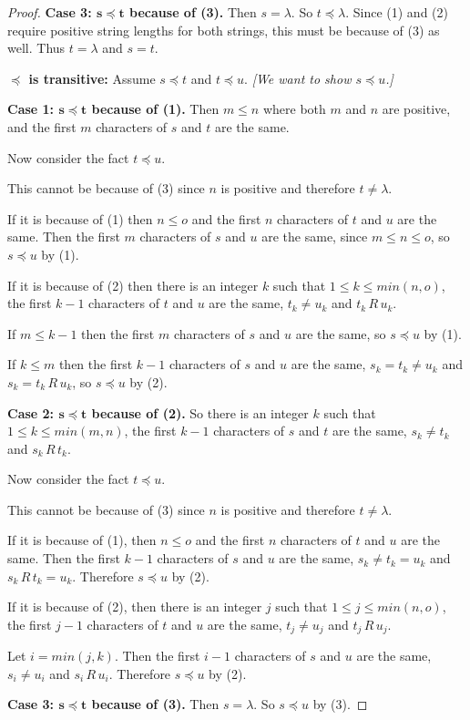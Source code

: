 \documentclass[14pt]{extarticle}
\begin{document}
\begin{proof}
                {\bf Case 3: \(\bm{s \preceq t}\) because of (3).} Then \(s = \lambda\). So \(t \preceq \lambda\). Since (1) and (2)
        require positive string lengths for both strings, this must be because of (3) as well. Thus \(t=\lambda\) and \(s=t\).

                {\bf \(\bm{\preceq}\) is transitive:} Assume \(s\preceq t\) and \(t\preceq u\). {\it[We want to show \(s\preceq u\).]}

                {\bf Case 1: \(\bm{s \preceq t}\) because of (1).} Then \(m \leq n\) where both $m$ and $n$ are positive, and the first
        $m$ characters of $s$ and $t$ are the same.

        Now consider the fact \(t \preceq u\).

        This cannot be because of (3) since $n$ is positive and therefore \(t \neq \lambda\).

        If it is because of (1) then \(n \leq o\) and the first $n$ characters of $t$ and $u$ are the same. Then the first $m$
        characters of $s$ and $u$ are the same, since \(m \leq n \leq o\), so \(s \preceq u\) by (1).

        If it is because of (2) then there is an integer $k$ such that \(1 \leq k \leq min(n,o)\), the first $k-1$ characters
        of $t$ and $u$ are the same, \(t_k \neq u_k\) and \(t_k \,R\, u_k\).

        If \(m \leq k-1\) then the first $m$ characters of $s$ and $u$ are the same, so \(s \preceq u\) by (1).

        If \(k \leq m\) then the first $k-1$ characters of $s$ and $u$ are the same, \(s_k = t_k \neq u_k\) and \(s_k = t_k \,R\, u_k\), so \(s \preceq u\) by (2).

                {\bf Case 2: \(\bm{s \preceq t}\) because of (2).} So there is an integer $k$ such that \(1 \leq k \leq min(m,n)\), the
        first $k-1$ characters of $s$ and $t$ are the same, \(s_k \neq t_k\) and \(s_k \,R\, t_k\).

        Now consider the fact \(t \preceq u\).

        This cannot be because of (3) since $n$ is positive and therefore \(t \neq \lambda\).

        If it is because of (1), then \(n \leq o\) and the first $n$ characters of $t$ and $u$ are the same. Then the first
        $k-1$ characters of $s$ and $u$ are the same, \(s_k \neq t_k = u_k\) and \(s_k \,R\, t_k = u_k\). Therefore
        \(s \preceq u\) by (2).

        If it is because of (2), then there is an integer $j$ such that \(1 \leq j \leq min(n, o)\), the first $j-1$
        characters of $t$ and $u$ are the same, \(t_j \neq u_j\) and \(t_j \,R\, u_j\).

        Let \(i = min(j,k)\). Then the first $i-1$ characters of $s$ and $u$ are the same, \(s_i \neq u_i\) and \(s_i \,R\,
        u_i\). Therefore \(s \preceq u\) by (2).

                {\bf Case 3: \(\bm{s \preceq t}\) because of (3).} Then \(s = \lambda\). So \(s \preceq u\) by (3).
\end{proof}
\end{document}
